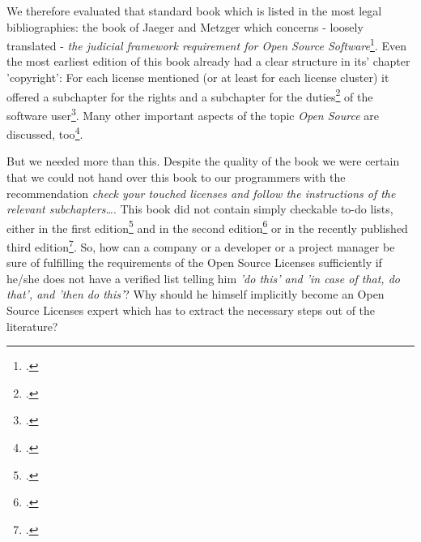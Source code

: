 We therefore evaluated that standard book which is listed in the most legal
bibliographies: the book of Jaeger and Metzger which concerns - loosely translated
- \textit{the judicial framework requirement for Open Source
Software}\footcite[cf.][V - It can not be any surprise that both authors,
Mr. Jaeger and Mr. Metzger are members of ifross (cf.
\texttt{http://www.ifross.org/personen/}, wp.)]{JaeMet2002a}. Even the most
earliest edition of this book already had a clear structure in its' chapter
'copyright': For each license mentioned (or at least for each license cluster)
it offered a subchapter for the rights and a subchapter for the
duties\footcite[cf.][30ff]{JaeMet2002a} of the software user\footcite[For
getting a good survey of the structure and the line of thought see the contents
cf.][VIIIf]{JaeMet2002a}. Many other important aspects of the topic
\textit{Open Source} are discussed, too\footcite[pars pro toto: have a
look at the chapter concerning the liability: cf.][137ff]{JaeMet2002a}.

But we needed more than this. Despite the quality of the book we were certain
that we could not hand over this book to our programmers with the recommendation
\textit{check your touched licenses and follow the instructions of the relevant
subchapters\ldots}. This book did not contain simply checkable to-do lists,
either in the first edition\footcite[cf.][VIff]{JaeMet2002a} and in the
second edition\footcite[cf.][VIIff]{JaeMet2006a} or in the recently
published third edition\footcite[cf.][VIIIff. Naturally we use this latest
edition for adopting or discussing systematical aspects]{JaeMet2011a}. So, how
can a company or a developer or a project manager be sure of fulfilling the
requirements of the Open Source Licenses sufficiently if he/she does not have a
verified list telling him \textit{'do this' and 'in case of that, do that', and
'then do this'}? Why should he himself implicitly become an Open Source Licenses
expert which has to extract the necessary steps out of the literature?

%
